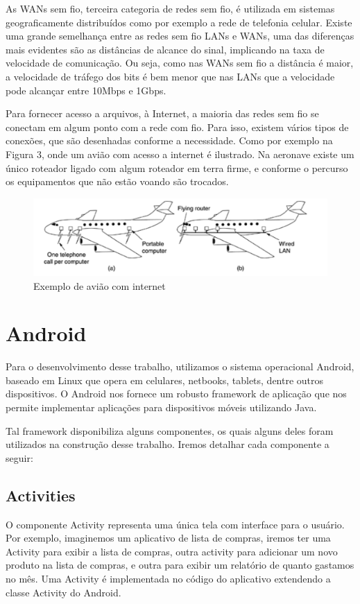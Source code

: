 \documentclass[12pt, %
openright, 
oneside,
a4paper,
brazil]{facom-ufu-abntex2}
\begin{document}
As WANs sem fio, terceira categoria de redes sem fio, é utilizada em sistemas geograficamente distribuídos como por exemplo a rede de telefonia celular. Existe uma grande semelhança entre as redes sem fio LANs e WANs, uma das diferenças mais evidentes são as distâncias de alcance do sinal, implicando na taxa de velocidade de comunicação. Ou seja, como nas WANs sem fio a distância é maior, a velocidade de tráfego dos bits é bem menor que nas LANs que a velocidade pode alcançar entre 10Mbps e 1Gbps.

Para fornecer acesso a arquivos, à Internet, a maioria das redes sem fio se conectam em algum ponto com a rede com fio. Para isso, existem vários tipos de conexões, que são desenhadas conforme a necessidade. Como por exemplo na Figura 3, onde um avião com acesso a internet é ilustrado. Na aeronave existe um único roteador ligado com algum roteador em terra firme, e conforme o percurso os equipamentos  que não estão voando são trocados.

\begin{figure}[hbt]
  \includegraphics[scale=0.9]{aviao}
  \caption{Exemplo de avião com internet \cite{tanenbaum2003redes}}
\end{figure}



\section{Android}

	Para o desenvolvimento desse trabalho, utilizamos o sistema operacional Android, baseado em Linux que opera em celulares, netbooks, tablets, dentre outros dispositivos. O Android nos fornece um robusto framework de aplicação que nos permite implementar aplicações para dispositivos móveis utilizando Java.
	

	Tal framework disponibiliza alguns componentes, os quais alguns deles foram utilizados na construção desse trabalho.
	Iremos detalhar cada componente a seguir:
	\cite{googleand}
	
	\subsection{Activities}
	O componente Activity representa uma única tela com interface para o usuário. Por exemplo, imaginemos um aplicativo de lista de compras, iremos ter uma Activity para exibir a lista de compras, outra activity para adicionar um novo produto na lista de compras, e outra para exibir um relatório de quanto gastamos no mês.
	Uma Activity é implementada no código do aplicativo extendendo a classe Activity do Android.
	
\end{document}
